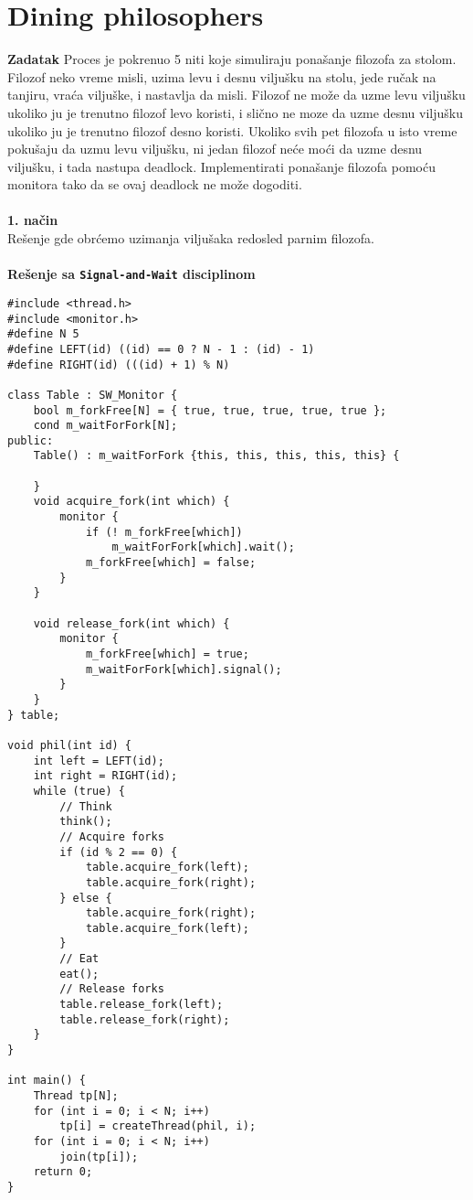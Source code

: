 \clearpage
\section{\latin Dining philosophers}
\textbf{\large Zadatak} Proces je pokrenuo 5 niti koje simuliraju pona\v{s}anje filozofa za stolom. Filozof neko vreme misli, uzima levu i desnu vilju\v{s}ku na stolu, jede ru\v{c}ak na tanjiru, vra\'{c}a vilju\v{s}ke, i nastavlja da misli. Filozof ne mo\v{z}e da uzme levu vilju\v{s}ku ukoliko ju je trenutno filozof levo koristi, i sli\v{c}no ne mo{z}e da uzme desnu vilju\v{s}ku ukoliko ju je trenutno filozof desno koristi. Ukoliko svih pet filozofa u isto vreme poku\v{s}aju da uzmu levu vilju\v{s}ku, ni jedan filozof ne\'{c}e mo\'{c}i da uzme desnu vilju\v{s}ku, i tada nastupa deadlock. Implementirati pona\v{s}anje filozofa pomo\'{c}u monitora tako da se ovaj deadlock ne mo\v{z}e dogoditi.
\\\\
\textbf{\large 1. na\v{c}in}\\
Re\v{s}enje gde obr\'{c}emo uzimanja vilju\v{s}aka redosled parnim filozofa.
\\\\
\textbf{Re\v{s}enje sa \texttt{Signal-and-Wait} disciplinom}
\begin{lstlisting}
#include <thread.h>
#include <monitor.h>
#define N 5
#define LEFT(id) ((id) == 0 ? N - 1 : (id) - 1)
#define RIGHT(id) (((id) + 1) % N)

class Table : SW_Monitor {
    bool m_forkFree[N] = { true, true, true, true, true };
    cond m_waitForFork[N];
public:
    Table() : m_waitForFork {this, this, this, this, this} {
        
    }
    void acquire_fork(int which) {
        monitor {
            if (! m_forkFree[which]) 
                m_waitForFork[which].wait();
            m_forkFree[which] = false;
        }
    }

    void release_fork(int which) {
        monitor {
            m_forkFree[which] = true;
            m_waitForFork[which].signal();
        }
    }
} table;

void phil(int id) {
    int left = LEFT(id);
    int right = RIGHT(id);
    while (true) {
        // Think
        think();
        // Acquire forks
        if (id % 2 == 0) {
            table.acquire_fork(left);
            table.acquire_fork(right);
        } else {
            table.acquire_fork(right);
            table.acquire_fork(left);
        }
        // Eat
        eat();
        // Release forks
        table.release_fork(left);
        table.release_fork(right);
    }
}

int main() {
    Thread tp[N];
    for (int i = 0; i < N; i++) 
        tp[i] = createThread(phil, i);
    for (int i = 0; i < N; i++) 
        join(tp[i]);
    return 0;
}

\end{lstlisting}
